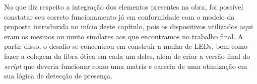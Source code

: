 No que diz respeito a integração dos elementos presentes na obra, foi possível constatar seu correto funcionamento já em conformidade com o modelo da proposta introduzida no início deste capítulo, pois os dispositivos utilizados aqui eram os mesmos ou muito similares aos que encontramos no trabalho final. A partir disso, o desafio se concentrou em construir a malha de LEDs, bem como fazer a colagem da fibra ótica em cada um deles, além de criar a versão final do \textit{script} que deveria funcionar como uma matriz e carecia de uma otimização em sua lógica de detecção de presença.

   
